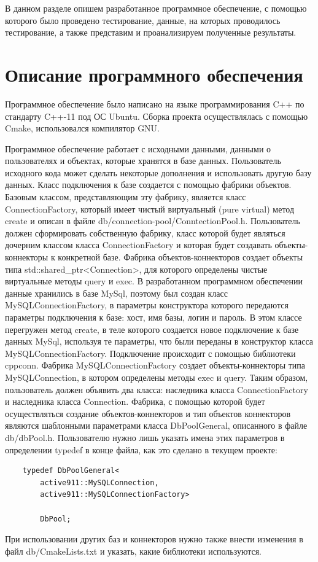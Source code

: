 В данном разделе опишем разработанное программное обеспечение, с помощью
которого было проведено тестирование, данные, на которых проводилось
тестирование, а также представим и проанализируем полученные результаты.
\section{Описание программного обеспечения}
Программное обеспечение было написано на языке программирования
C++ по стандарту C++-11 под ОС Ubuntu. Сборка проекта осуществлялась
с помощью Cmake, использовался компилятор GNU.

Программное обеспечение работает с исходными данными,
данными о пользователях и объектах, которые хранятся в базе данных.
Пользователь исходного кода может сделать некоторые дополнения и
использовать другую базу данных. Класс подключения к базе создается
с помощью фабрики объектов.
Базовым классом, представляющим эту фабрику, является класс
ConnectionFactory, который имеет чистый виртуальный (pure virtual)
метод create и описан в файле db/connection-pool/ConntectionPool.h.
Пользователь должен сформировать собственную фабрику, класс которой
будет являться дочерним классом класса ConnectionFactory и которая
будет создавать объекты-коннекторы к конкретной базе.
Фабрика объектов-коннекторов создает объекты типа
std::shared\_ptr<Connection>, для которого определены чистые виртуальные методы
query и exec.
В разработанном
программном обеспечении данные хранились в базе MySql, поэтому был
создан класс MySQLConnectionFactory, в параметры конструктора которого
передаются параметры подключения к базе: хост, имя базы, логин и
пароль. В этом классе перегружен метод create, в теле которого
создается новое подключение к базе данных MySql, используя те
параметры, что были переданы в конструктор класса
MySQLConnectionFactory. Подключение происходит с помощью библиотеки
cppconn. Фабрика MySQLConnectionFactory создает объекты-коннекторы
типа MySQLConnection, в котором определены методы exec и query.
Таким образом, пользователь должен объявить два класса:
наследника класса ConnectionFactory и наследника класса Connection.
Фабрика, с помощью которой будет осуществляться создание объектов-коннекторов
и тип объектов коннекторов являются шаблонными параметрами класса
DbPoolGeneral, описанного в файле db/dbPool.h. Пользователю нужно
лишь указать имена этих параметров в определении typedef в конце файла,
как это сделано в текущем проекте:
\begin{verbatim}
	typedef DbPoolGeneral<
		active911::MySQLConnection,
		active911::MySQLConnectionFactory>

		DbPool;
\end{verbatim}
При использовании других баз и коннекторов нужно также внести изменения в файл
db/CmakeLists.txt и указать, какие библиотеки используются.

